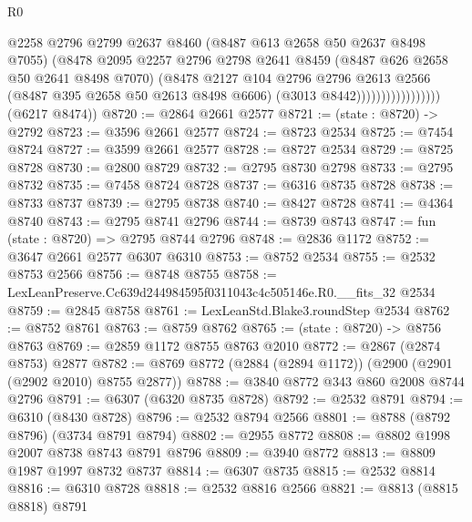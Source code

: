 \begin{lexlean}{R0}
\begin{coremodule}
                                  @2258
                                  @2796
                                  @2799
                                  @2637
                                  @8460
                                  (@8487 @613 @2658 @50 @2637 @8498 @7055)
                                  (@8478
                                    @2095
                                    @2257
                                    @2796
                                    @2798
                                    @2641
                                    @8459
                                    (@8487 @626 @2658 @50 @2641 @8498 @7070)
                                    (@8478
                                      @2127
                                      @104
                                      @2796
                                      @2796
                                      @2613
                                      @2566
                                      (@8487 @395 @2658 @50 @2613 @8498 @6606)
                                      (@3013 @8442)))))))))))))))))
      (@6217 @8474))
@8720 := @2864 @2661 @2577
@8721 := (state : @8720) -> @2792
@8723 := @3596 @2661 @2577
@8724 := @8723 @2534
@8725 := @7454 @8724
@8727 := @3599 @2661 @2577
@8728 := @8727 @2534
@8729 := @8725 @8728
@8730 := @2800 @8729
@8732 := @2795 @8730 @2798
@8733 := @2795 @8732
@8735 := @7458 @8724 @8728
@8737 := @6316 @8735 @8728
@8738 := @8733 @8737
@8739 := @2795 @8738
@8740 := @8427 @8728
@8741 := @4364 @8740
@8743 := @2795 @8741 @2796
@8744 := @8739 @8743
@8747 := fun (state : @8720) => @2795 @8744 @2796
@8748 := @2836 @1172
@8752 := @3647 @2661 @2577 @6307 @6310
@8753 := @8752 @2534
@8755 := @2532 @8753 @2566
@8756 := @8748 @8755
@8758 := LexLeanPreserve.Cc639d244984595f0311043c4c505146e.R0.__fits_32 @2534
@8759 := @2845 @8758
@8761 := LexLeanStd.Blake3.roundStep @2534
@8762 := @8752 @8761
@8763 := @8759 @8762
@8765 := (state : @8720) -> @8756 @8763
@8769 := @2859 @1172 @8755 @8763 @2010
@8772 := @2867 (@2874 @8753) @2877
@8782 := @8769 @8772 (@2884 (@2894 @1172)) (@2900 (@2901 (@2902 @2010) @8755 @2877))
@8788 := @3840 @8772 @343 @860 @2008 @8744 @2796
@8791 := @6307 (@6320 @8735 @8728)
@8792 := @2532 @8791
@8794 := @6310 (@8430 @8728)
@8796 := @2532 @8794 @2566
@8801 := @8788 (@8792 @8796) (@3734 @8791 @8794)
@8802 := @2955 @8772
@8808 := @8802 @1998 @2007 @8738 @8743 @8791 @8796
@8809 := @3940 @8772
@8813 := @8809 @1987 @1997 @8732 @8737
@8814 := @6307 @8735
@8815 := @2532 @8814
@8816 := @6310 @8728
@8818 := @2532 @8816 @2566
@8821 := @8813 (@8815 @8818) @8791

\end{coremodule}
\end{lexlean}
